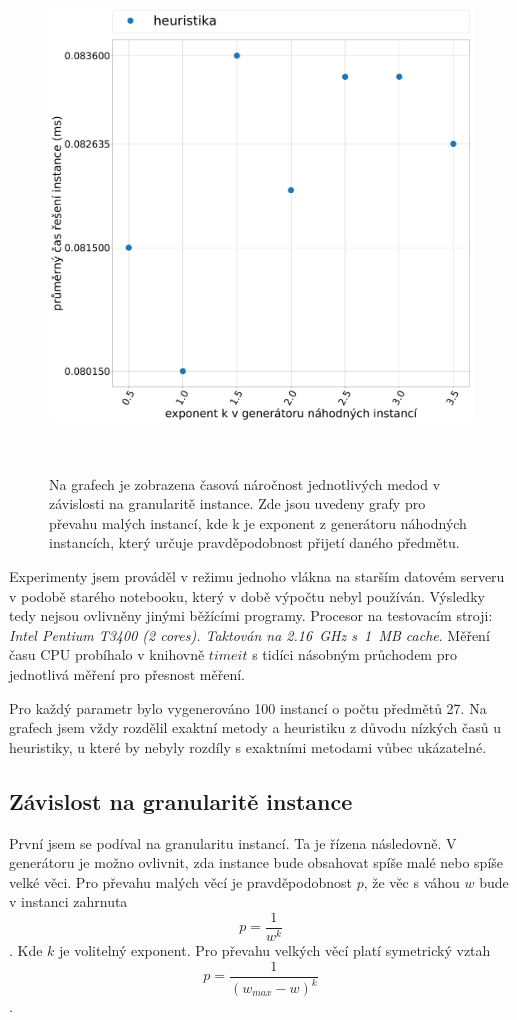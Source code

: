 \documentclass[11pt]{article}
\begin{document}
\begin{figure}
\begin{minipage}[c]{0.49\textwidth}
        \centering \includegraphics[width=\textwidth]{img/GMH.pdf} 
    \end{minipage}
    \\
   \caption{Na grafech je zobrazena časová náročnost jednotlivých medod v závislosti na granularitě instance. Zde jsou uvedeny grafy pro převahu malých instancí, kde k je exponent z generátoru náhodných instancích, který určuje pravděpodobnost přijetí daného předmětu.}\label{fig:GMI}
    \end{figure} 
 

 
 
Experimenty jsem prováděl v režimu jednoho vlákna na starším datovém serveru v podobě starého notebooku, který v době výpočtu nebyl používán. Výsledky tedy nejsou ovlivněny jinými běžícími programy. Procesor na testovacím stroji: \textit{Intel Pentium T3400 (2 cores). Taktován na 2.16~GHz s~1~MB cache}.
Měření času CPU probíhalo v knihovně $timeit$ s tidíci násobným průchodem pro jednotlivá měření pro přesnost měření.

Pro každý parametr bylo vygenerováno 100 instancí o počtu předmětů 27. Na grafech jsem vždy rozdělil exaktní metody a heuristiku z důvodu nízkých časů u heuristiky, u které by nebyly rozdíly s exaktními metodami vůbec ukázatelné. 


\subsection{Závislost na granularitě instance}
První jsem se podíval na granularitu instancí. Ta je řízena následovně. V generátoru je možno ovlivnit, zda instance bude obsahovat spíše malé nebo spíše velké věci. Pro převahu malých věcí je pravděpodobnost $p$, že věc s váhou $w$ bude v instanci zahrnuta $$ p=\frac{1 }{ w^k}$$. Kde $k$ je volitelný exponent. Pro převahu velkých věcí platí symetrický vztah $$ p=\frac{1}  {(w_{max}-w)^k}$$.
\end{document}
